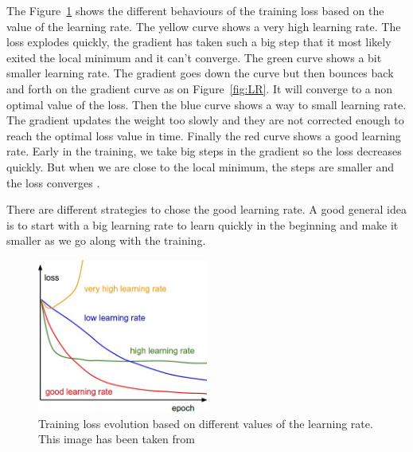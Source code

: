 The Figure~\ref{fig:LR_impact} shows the different behaviours of the training loss based on the value of the learning rate. The yellow curve shows a very high learning rate. The loss explodes quickly, the gradient has taken such a big step that it most likely exited the local minimum and it can't converge. The green curve shows a bit smaller learning rate. The gradient goes down the curve but then bounces back and forth on the gradient curve as on Figure~\ref{fig:LR}. It will converge to a non optimal value of the loss. Then the blue curve shows a way to small learning rate. The gradient updates the weight too slowly and they are not corrected enough to reach the optimal loss value in time. Finally the red curve shows a good learning rate. Early in the training, we take big steps in the gradient so the loss decreases quickly. But when we are close to the local minimum, the steps are smaller and the loss converges \cite{lr}. 

There are different strategies to chose the good learning rate. A good general idea is to start with a big learning rate to learn quickly in the beginning and make it smaller as we go along with the training. 
\begin{figure}[!htp]
    \centering
        \includegraphics[width=0.5\textwidth]{figures/02-LR_impatc_train}
        \caption[Impact of the learning rate on training]{Training loss evolution based on different values of the learning rate. This image has been taken from \cite{cs231n}}\label{fig:LR_impact}
\end{figure}

